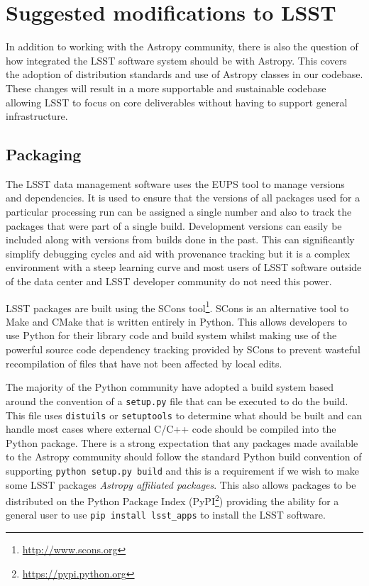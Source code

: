 \documentclass[]{spie}  %
\begin{document}
\section{Suggested modifications to LSST}

In addition to working with the Astropy community, there is also the question of how integrated the LSST software system should be with Astropy.
This covers the adoption of distribution standards and use of Astropy classes in our codebase.
These changes will result in a more supportable and sustainable codebase allowing LSST to focus on core deliverables without having to support general infrastructure.

\subsection{Packaging}

\label{sec:packaging}

The LSST data management software uses the EUPS tool\cite{EUPS} to manage versions and dependencies.
It is used to ensure that the versions of all packages used for a particular processing run can be assigned a single number and also to track the packages that were part of a single build.
Development versions can easily be included along with versions from builds done in the past.
This can significantly simplify debugging cycles and aid with provenance tracking but it is a complex environment with a steep learning curve and most users of LSST software outside of the data center and LSST developer community do not need this power.

LSST packages are built using the SCons tool\footnote{\url{http://www.scons.org}}\cite{2005Scons1377085}.
SCons is an alternative tool to Make and CMake that is written entirely in Python.
This allows developers to use Python for their library code and build system whilst making use of the powerful source code dependency tracking provided by SCons to prevent wasteful recompilation of files that have not been affected by local edits.

The majority of the Python community have adopted a build system based around the convention of a \texttt{setup.py} file that can be executed to do the build.
This file uses \texttt{distuils} or \texttt{setuptools} to determine what should be built and can handle most cases where external C/C++ code should be compiled into the Python package.
There is a strong expectation that any packages made available to the Astropy community should follow the standard Python build convention of supporting \texttt{python setup.py build} and this is a requirement if we wish to make some LSST packages \emph{Astropy affiliated packages}.
This also allows packages to be distributed on the Python Package Index (PyPI\footnote{\url{https://pypi.python.org}}) providing the ability for a general user to use \texttt{pip install lsst\_apps} to install the LSST software.
\end{document}
